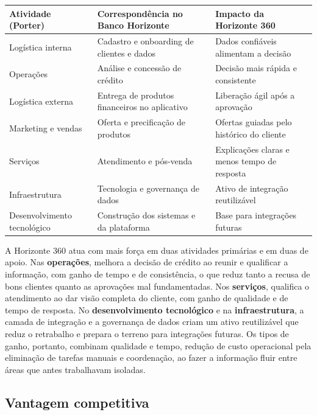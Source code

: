\documentclass[12pt,a4paper]{article}
\begin{document}
\begin{table}[h]
\centering
\small
\renewcommand{\arraystretch}{1.3}
\begin{tabular}{|p{3.6cm}|p{5.7cm}|p{5.2cm}|}
\hline
\textbf{Atividade (Porter)} & \textbf{Correspond\^encia no Banco Horizonte} & \textbf{Impacto da Horizonte 360}\\
\hline
Log\'istica interna & Cadastro e onboarding de clientes e dados & Dados confi\'aveis alimentam a decis\~ao\\
\hline
Opera\c{c}\~oes & An\'alise e concess\~ao de cr\'edito & Decis\~ao mais r\'apida e consistente\\
\hline
Log\'istica externa & Entrega de produtos financeiros no aplicativo & Libera\c{c}\~ao \'agil ap\'os a aprova\c{c}\~ao\\
\hline
Marketing e vendas & Oferta e precifica\c{c}\~ao de produtos & Ofertas guiadas pelo hist\'orico do cliente\\
\hline
Servi\c{c}os & Atendimento e p\'os-venda & Explica\c{c}\~oes claras e menos tempo de resposta\\
\hline
Infraestrutura & Tecnologia e governan\c{c}a de dados & Ativo de integra\c{c}\~ao reutiliz\'avel\\
\hline
Desenvolvimento tecnol\'ogico & Constru\c{c}\~ao dos sistemas e da plataforma & Base para integra\c{c}\~oes futuras\\
\hline
\end{tabular}
\end{table}

A Horizonte 360 atua com mais for\c{c}a em duas atividades prim\'arias e em duas de apoio. Nas \textbf{opera\c{c}\~oes}, melhora a decis\~ao de cr\'edito ao reunir e qualificar a informa\c{c}\~ao, com ganho de tempo e de consist\^encia, o que reduz tanto a recusa de bons clientes quanto as aprova\c{c}\~oes mal fundamentadas. Nos \textbf{servi\c{c}os}, qualifica o atendimento ao dar vis\~ao completa do cliente, com ganho de qualidade e de tempo de resposta. No \textbf{desenvolvimento tecnol\'ogico} e na \textbf{infraestrutura}, a camada de integra\c{c}\~ao e a governan\c{c}a de dados criam um ativo reutiliz\'avel que reduz o retrabalho e prepara o terreno para integra\c{c}\~oes futuras. Os tipos de ganho, portanto, combinam qualidade e tempo, redu\c{c}\~ao de custo operacional pela elimina\c{c}\~ao de tarefas manuais e coordena\c{c}\~ao, ao fazer a informa\c{c}\~ao fluir entre \'areas que antes trabalhavam isoladas.

\subsection{Vantagem competitiva}
\end{document}
